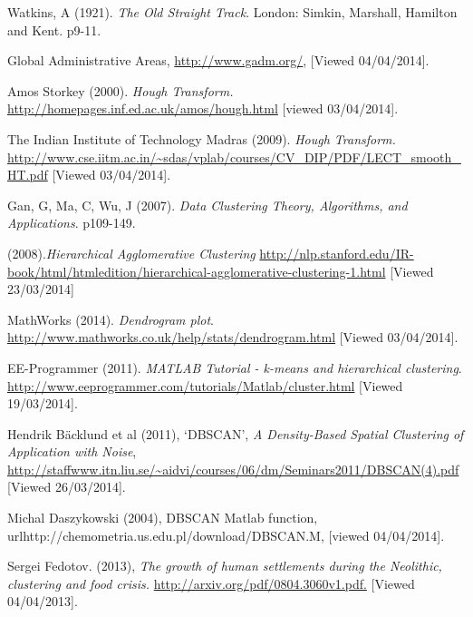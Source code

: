 \documentclass[a4paper]{article}
\begin{document}
\pagebreak
\begin{thebibliography}{1}

Watkins, A (1921). {\em The Old Straight Track}. London: Simkin, Marshall, Hamilton and Kent. p9-11.

 Global Administrative Areas, \url{http://www.gadm.org/}, [Viewed 04/04/2014].

 Amos Storkey (2000). {\em Hough Transform.}  \url{ http://homepages.inf.ed.ac.uk/amos/hough.html} [viewed 03/04/2014].

 The Indian Institute of Technology Madras (2009). {\em Hough Transform.} \url{ http://www.cse.iitm.ac.in/~sdas/vplab/courses/CV_DIP/PDF/LECT_smooth_HT.pdf} [Viewed 03/04/2014].

 Gan, G, Ma, C, Wu, J (2007). {\em Data Clustering Theory, Algorithms, and Applications}. p109-149.

 (2008).{\em Hierarchical Agglomerative Clustering} \url{http://nlp.stanford.edu/IR-book/html/htmledition/hierarchical-agglomerative-clustering-1.html} [Viewed 23/03/2014]

 MathWorks (2014). {\em Dendrogram plot}. \url{http://www.mathworks.co.uk/help/stats/dendrogram.html} [Viewed 03/04/2014].

 EE-Programmer (2011). {\em MATLAB Tutorial - k-means and hierarchical clustering}. \url{http://www.eeprogrammer.com/tutorials/Matlab/cluster.html} 
[Viewed 19/03/2014].

 Hendrik B{\"a}cklund et al (2011), `DBSCAN', {\em A Density-Based Spatial Clustering of Application with Noise},  \url{http://staffwww.itn.liu.se/~aidvi/courses/06/dm/Seminars2011/DBSCAN(4).pdf} [Viewed 26/03/2014].

 Michal Daszykowski (2004), DBSCAN Matlab function, url{http://chemometria.us.edu.pl/download/DBSCAN.M}, [viewed 04/04/2014].

 Sergei Fedotov. (2013), {\em The growth of human settlements during the Neolithic, clustering and food crisis.} \url{http://arxiv.org/pdf/0804.3060v1.pdf.} [Viewed  04/04/2013].

\end{thebibliography}
\end{document}

